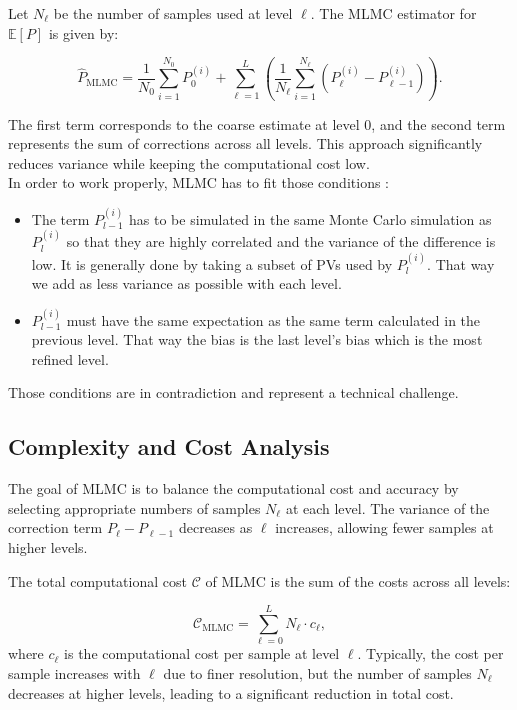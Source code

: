 \documentclass{article}
\begin{document}
Let \( N_\ell \) be the number of samples used at level \( \ell \). The MLMC estimator for \( \mathbb{E}[P] \) is given by:

\[
\hat{P}_{\text{MLMC}} = \frac{1}{N_0} \sum_{i=1}^{N_0} P_0^{(i)} + \sum_{\ell=1}^{L} \left( \frac{1}{N_\ell} \sum_{i=1}^{N_\ell} \left( P_\ell^{(i)} - P_{\ell-1}^{(i)} \right) \right).
\]

The first term corresponds to the coarse estimate at level \( 0 \), and the second term represents the sum of corrections across all levels. This approach significantly reduces variance while keeping the computational cost low.\\
In order to work properly, MLMC has to fit those conditions :

\begin{itemize}
    \item The term $P^{(i)}_{l-1}$ has to be simulated in the same Monte Carlo simulation as $P^{(i)}_{l}$ so that they are highly correlated and the variance of the difference is low. It is generally done by taking a subset of PVs used by $P^{(i)}_{l}$. That way we add as less variance as possible with each level.
    \item $P^{(i)}_{l-1}$ must have the same expectation as the same term calculated in the previous level. That way the bias is the last level's bias which is the most refined level.
\end{itemize}

Those conditions are in contradiction and represent a technical challenge.

\subsection*{Complexity and Cost Analysis}

The goal of MLMC is to balance the computational cost and accuracy by selecting appropriate numbers of samples \( N_\ell \) at each level. The variance of the correction term \( P_\ell - P_{\ell-1} \) decreases as \( \ell \) increases, allowing fewer samples at higher levels.

The total computational cost \( \mathcal{C} \) of MLMC is the sum of the costs across all levels:

\[
\mathcal{C}_{\text{MLMC}} = \sum_{\ell=0}^{L} N_\ell \cdot c_\ell,
\]
where \( c_\ell \) is the computational cost per sample at level \( \ell \). Typically, the cost per sample increases with \( \ell \) due to finer resolution, but the number of samples \( N_\ell \) decreases at higher levels, leading to a significant reduction in total cost.
\end{document}
